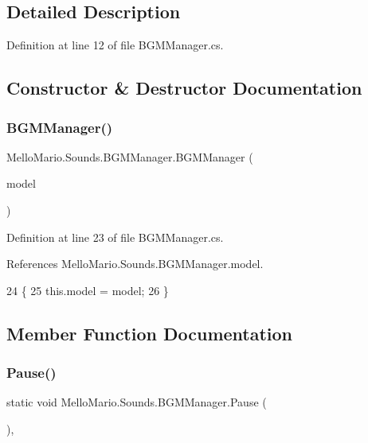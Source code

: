 \subsection{Detailed Description}


Definition at line 12 of file B\+G\+M\+Manager.\+cs.



\subsection{Constructor \& Destructor Documentation}
\mbox{\label{classMelloMario_1_1Sounds_1_1BGMManager_a34b94308d2aada71fe09143d84181335}} 
\subsubsection{B\+G\+M\+Manager()}
{\footnotesize\ttfamily Mello\+Mario.\+Sounds.\+B\+G\+M\+Manager.\+B\+G\+M\+Manager (\begin{DoxyParamCaption}\item[{\textbf{ I\+Model}}]{model }\end{DoxyParamCaption})}



Definition at line 23 of file B\+G\+M\+Manager.\+cs.



References Mello\+Mario.\+Sounds.\+B\+G\+M\+Manager.\+model.


\begin{DoxyCode}
24         \{
25             this.model = model;
26         \}
\end{DoxyCode}


\subsection{Member Function Documentation}
\mbox{\label{classMelloMario_1_1Sounds_1_1BGMManager_a7cb559fc36af65d0276c72dd9387568f}} 
\subsubsection{Pause()}
{\footnotesize\ttfamily static void Mello\+Mario.\+Sounds.\+B\+G\+M\+Manager.\+Pause (\begin{DoxyParamCaption}{ }\end{DoxyParamCaption})\hspace{0.3cm}{\ttfamily [static]}, {\ttfamily [private]}}




